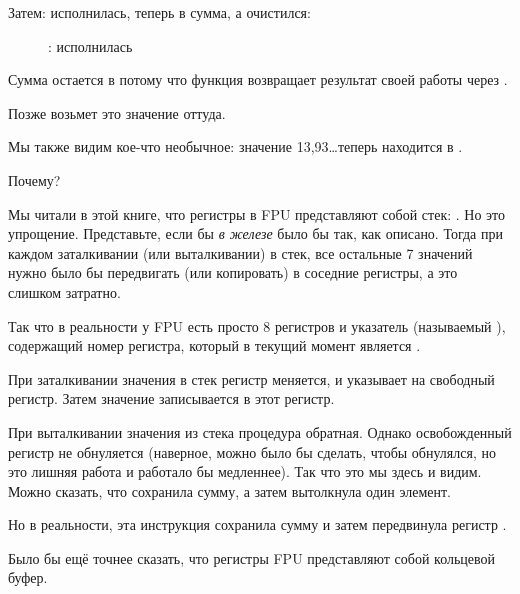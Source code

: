 \clearpage
Затем: \FADDP исполнилась, теперь в  сумма, а  очистился:

\begin{figure}[H]
\centering
{}
\caption{\olly: \FADDP исполнилась}
\label{fig:FPU_simple_olly_5}
\end{figure}

Сумма остается в  потому что функция возвращает результат своей работы через .

Позже \main возьмет это значение оттуда.

Мы также видим кое-что необычное: значение 13,93\ldots теперь находится в .

Почему?

\label{FPU_is_rather_circular_buffer}
Мы читали в этой книге, что регистры в \ac{FPU} представляют собой стек: . 
Но это упрощение.
Представьте, если бы \emph{в железе} было бы так, как описано. Тогда при каждом заталкивании (или выталкивании) в стек,
все остальные 7 значений нужно было бы передвигать (или копировать) в соседние регистры, 
а это слишком затратно.

Так что в реальности у
\ac{FPU} есть просто 8 регистров и указатель (называемый ), содержащий номер регистра,
который в текущий момент является .

При заталкивании значения в стек регистр  меняется, и указывает на свободный регистр. 
Затем значение записывается в этот регистр.

При выталкивании значения из стека процедура обратная. Однако освобожденный регистр не обнуляется
(наверное, можно было бы сделать, чтобы обнулялся, но это лишняя работа и работало бы медленнее).
Так что это мы здесь и видим. 
Можно сказать, что \FADDP сохранила сумму, а затем вытолкнула один элемент.

Но в реальности, эта инструкция сохранила сумму и затем передвинула регистр .

Было бы ещё точнее сказать, что регистры \ac{FPU} представляют собой кольцевой буфер.

